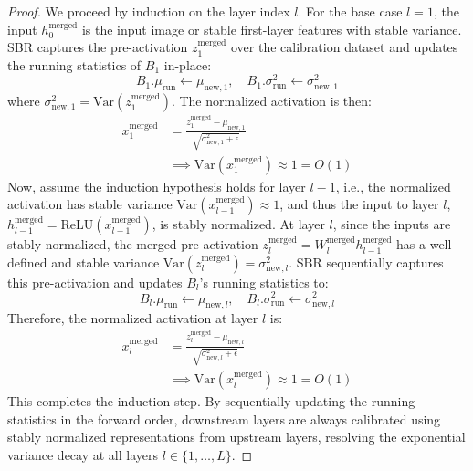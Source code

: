 \documentclass{article}
\theoremstyle{plain}
\theoremstyle{definition}
\theoremstyle{remark}
\begin{document}
\begin{proof}
We proceed by induction on the layer index $l$. 
For the base case $l=1$, the input $h_0^{\text{merged}}$ is the input image or stable first-layer features with stable variance. SBR captures the pre-activation $z_1^{\text{merged}}$ over the calibration dataset and updates the running statistics of $B_1$ in-place:
\begin{equation}
B_1.\mu_{\text{run}} \leftarrow \mu_{\text{new}, 1}, \quad B_1.\sigma^2_{\text{run}} \leftarrow \sigma^2_{\text{new}, 1}
\end{equation}
where $\sigma^2_{\text{new}, 1} = \text{Var}(z_1^{\text{merged}})$. The normalized activation is then:
\begin{align}
x_1^{\text{merged}} &= \frac{z_1^{\text{merged}} - \mu_{\text{new}, 1}}{\sqrt{\sigma^2_{\text{new}, 1} + \epsilon}} \nonumber \\
&\implies \text{Var}(x_1^{\text{merged}}) \approx 1 = O(1)
\end{align}
Now, assume the induction hypothesis holds for layer $l-1$, i.e., the normalized activation has stable variance $\text{Var}(x_{l-1}^{\text{merged}}) \approx 1$, and thus the input to layer $l$, $h_{l-1}^{\text{merged}} = \text{ReLU}(x_{l-1}^{\text{merged}})$, is stably normalized. 
At layer $l$, since the inputs are stably normalized, the merged pre-activation $z_l^{\text{merged}} = W_l^{\text{merged}} h_{l-1}^{\text{merged}}$ has a well-defined and stable variance $\text{Var}(z_l^{\text{merged}}) = \sigma^2_{\text{new}, l}$. SBR sequentially captures this pre-activation and updates $B_l$'s running statistics to:
\begin{equation}
B_l.\mu_{\text{run}} \leftarrow \mu_{\text{new}, l}, \quad B_l.\sigma^2_{\text{run}} \leftarrow \sigma^2_{\text{new}, l}
\end{equation}
Therefore, the normalized activation at layer $l$ is:
\begin{align}
x_l^{\text{merged}} &= \frac{z_l^{\text{merged}} - \mu_{\text{new}, l}}{\sqrt{\sigma^2_{\text{new}, l} + \epsilon}} \nonumber \\
&\implies \text{Var}(x_l^{\text{merged}}) \approx 1 = O(1)
\end{align}
This completes the induction step. By sequentially updating the running statistics in the forward order, downstream layers are always calibrated using stably normalized representations from upstream layers, resolving the exponential variance decay at all layers $l \in \{1, \dots, L\}$.
\end{proof}
\end{document}
